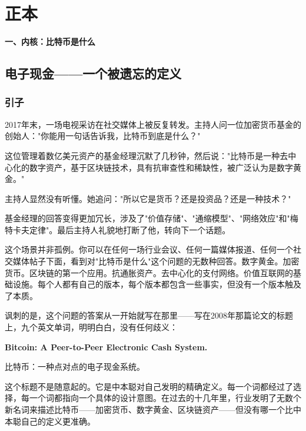 \documentclass[a4paper,12pt,openany]{ctexbook}
\begin{document}
\part{正本}



\vspace{2em}
\begin{center}
{\Large\bfseries 一、内核：比特币是什么}
\end{center}
\vspace{1em}



\chapter{电子现金——一个被遗忘的定义}



\section*{引子}


2017年末，一场电视采访在社交媒体上被反复转发。主持人问一位加密货币基金的创始人："你能用一句话告诉我，比特币到底是什么？"

这位管理着数亿美元资产的基金经理沉默了几秒钟，然后说："比特币是一种去中心化的数字资产，基于区块链技术，具有抗审查性和稀缺性，被广泛认为是数字黄金。"

主持人显然没有听懂。她追问："所以它是货币？还是投资品？还是一种技术？"

基金经理的回答变得更加冗长，涉及了"价值存储"、"通缩模型"、"网络效应"和"梅特卡夫定律"。最后主持人礼貌地打断了他，转向下一个话题。

这个场景并非孤例。你可以在任何一场行业会议、任何一篇媒体报道、任何一个社交媒体帖子下面，看到对"比特币是什么"这个问题的无数种回答。数字黄金。加密货币。区块链的第一个应用。抗通胀资产。去中心化的支付网络。价值互联网的基础设施。每个人都有自己的版本，每个版本都包含一些事实，但没有一个版本触及了本质。

讽刺的是，这个问题的答案从一开始就写在那里——写在2008年那篇论文的标题上，九个英文单词，明明白白，没有任何歧义：

\textbf{Bitcoin: A Peer-to-Peer Electronic Cash System.}

比特币：一种点对点的电子现金系统。

这个标题不是随意起的。它是中本聪对自己发明的精确定义。每一个词都经过了选择，每一个词都指向一个具体的设计意图。在过去的十几年里，行业发明了无数个新名词来描述比特币——加密货币、数字黄金、区块链资产——但没有哪一个比中本聪自己的定义更准确。
\end{document}
